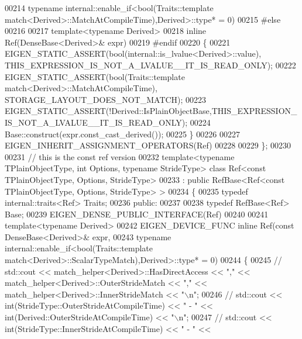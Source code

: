 \begin{DoxyCode}
00214                                  \textcolor{keyword}{typename} internal::enable\_if<\textcolor{keywordtype}{bool}(Traits::template 
      match<Derived>::MatchAtCompileTime),Derived>::type* = 0)
00215     \textcolor{preprocessor}{#else}
00216 
00217     \textcolor{keyword}{template}<\textcolor{keyword}{typename} Derived>
00218     \textcolor{keyword}{inline} Ref(DenseBase<Derived>& expr)
00219     \textcolor{preprocessor}{#endif}
00220     \{
00221       EIGEN\_STATIC\_ASSERT(\textcolor{keywordtype}{bool}(internal::is\_lvalue<Derived>::value), 
      THIS\_EXPRESSION\_IS\_NOT\_A\_LVALUE\_\_IT\_IS\_READ\_ONLY);
00222       EIGEN\_STATIC\_ASSERT(\textcolor{keywordtype}{bool}(Traits::template match<Derived>::MatchAtCompileTime), 
      STORAGE\_LAYOUT\_DOES\_NOT\_MATCH);
00223       EIGEN\_STATIC\_ASSERT(!Derived::IsPlainObjectBase,THIS\_EXPRESSION\_IS\_NOT\_A\_LVALUE\_\_IT\_IS\_READ\_ONLY);
00224       Base::construct(expr.const\_cast\_derived());
00225     \}
00226 
00227     EIGEN\_INHERIT\_ASSIGNMENT\_OPERATORS(Ref)
00228 
00229 \};
00230 
00231 \textcolor{comment}{// this is the const ref version}
00232 \textcolor{keyword}{template}<\textcolor{keyword}{typename} TPlainObjectType, \textcolor{keywordtype}{int} Options, \textcolor{keyword}{typename} Str\textcolor{keywordtype}{id}eType> \textcolor{keyword}{class }Ref<const TPlainObjectType, 
      Options, StrideType>
00233   : \textcolor{keyword}{public} RefBase<Ref<const TPlainObjectType, Options, StrideType> >
00234 \{
00235     \textcolor{keyword}{typedef} internal::traits<Ref> Traits;
00236   \textcolor{keyword}{public}:
00237 
00238     \textcolor{keyword}{typedef} RefBase<Ref> Base;
00239     EIGEN\_DENSE\_PUBLIC\_INTERFACE(Ref)
00240 
00241     \textcolor{keyword}{template}<\textcolor{keyword}{typename} Derived>
00242     EIGEN\_DEVICE\_FUNC \textcolor{keyword}{inline} Ref(\textcolor{keyword}{const} DenseBase<Derived>& expr,
00243                                  \textcolor{keyword}{typename} internal::enable\_if<\textcolor{keywordtype}{bool}(Traits::template 
      match<Derived>::ScalarTypeMatch),Derived>::type* = 0)
00244     \{
00245 \textcolor{comment}{//      std::cout << match\_helper<Derived>::HasDirectAccess << "," <<
       match\_helper<Derived>::OuterStrideMatch << "," << match\_helper<Derived>::InnerStrideMatch << "\(\backslash\)n";}
00246 \textcolor{comment}{//      std::cout << int(StrideType::OuterStrideAtCompileTime) << " - " <<
       int(Derived::OuterStrideAtCompileTime) << "\(\backslash\)n";}
00247 \textcolor{comment}{//      std::cout << int(StrideType::InnerStrideAtCompileTime) << " - " <<
}
\end{DoxyCode}
